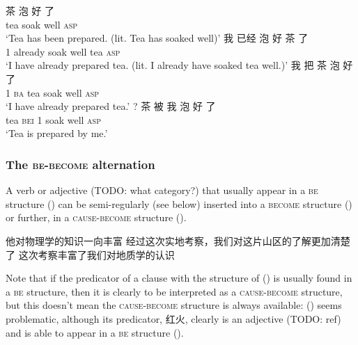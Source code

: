 \documentclass[UTF8, a4paper, oneside, scheme=plain]{ctexrep}
\newcommand{\translate}[1]{`#1'}
\newcommand*{\category}[1]{\textsc{#1}}
\begin{document}
\begin{exe}
    \ex\label{ex:verb-phrase.notional-pass.1} 
    \gll 茶 泡 好 了 \\
    tea soak well \category{asp} \\
    \translate{Tea has been prepared.
    (lit. Tea has soaked well)}
    \ex\label{ex:verb-phrase.notional-pass.trans-1} 
    \gll 我 已经 泡 好 茶 了 \\
    1 already soak well tea \category{asp} \\
    \glt \translate{I have already prepared tea. (lit. I already have soaked tea well.)}
    \ex\label{ex:verb-phrase.notional-pass.ba-1}
    \gll 我 把 茶 泡 好 了 \\
    1 \category{ba} tea soak well \category{asp} \\
    \glt \translate{I have already prepared tea.}
    \ex\label{ex:verb-phrase.notional-pass.bei-1} 
    \gll ? 茶 被 我 泡 好 了 \\
    {} tea \category{bei} 1 soak well \category{asp} \\
    \glt \translate{Tea is prepared by me.}
\end{exe}

\subsubsection{The \category{be}-\category{become} alternation}

A verb or adjective (TODO: what category?) that usually appear in a \category{be} structure 
()
can be semi-regularly (see below) inserted into a \category{become} structure 
()
or further, in a \category{cause}-\category{become} structure 
().

\begin{exe}
    \ex\label{ex:verb-phrase.be-become.source-1} 他对物理学的知识一向丰富
    \ex\label{ex:verb-phrase.be-become.1} 经过这次实地考察，我们对这片山区的了解更加清楚了
    \ex\label{ex:verb-phrase.be-become.cause-1} 这次考察丰富了我们对地质学的认识
\end{exe}

Note that if the predicator of 
a clause with the structure of ()
is usually found in a \category{be} structure, 
then it is clearly to be interpreted as a \category{cause}-\category{become} structure, 
but this doesn't mean the \category{cause}-\category{become} structure
is always available: 
() seems problematic,
although its predicator, 红火, clearly is an adjective (TODO: ref)
and is able to appear in a \category{be} structure 
().
\end{document}
